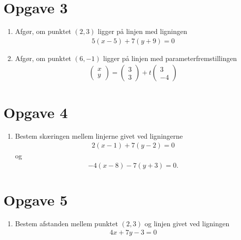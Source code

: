 \section*{Opgave 3}
\begin{enumerate}[label=\roman*)	]
	\item Afgør, om punktet $(2,3)$ ligger på linjen med ligningen 
	\begin{align*}
		5(x-5) + 7(y+9)=0
	\end{align*}
	\item Afgør, om punktet $(6,-1)$ ligger på linjen med parameterfremstillingen
	\begin{align*}
		\begin{pmatrix}
			x \\ y
		\end{pmatrix}
		=
		\begin{pmatrix}
			3 \\ 3
		\end{pmatrix}
		+ t
		\begin{pmatrix}
			3 \\ -4
		\end{pmatrix}
	\end{align*}
\end{enumerate}

\section*{Opgave 4}
\begin{enumerate}[label=\roman*)]
	\item Bestem skæringen mellem linjerne givet ved ligningerne
	\begin{align*}
		2(x-1)+7(y-2) = 0
	\end{align*}
	og 
	\begin{align*}
		-4(x-8) -7(y+3) = 0.
	\end{align*}
\end{enumerate}

\section*{Opgave 5}
\begin{enumerate}[label=\roman*)]
	\item Bestem afstanden mellem punktet $(2,3)$ og linjen givet ved ligningen
	\begin{align*}
		4x+7y-3=0
	\end{align*}
\end{enumerate}
